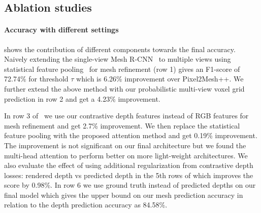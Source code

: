 \subsection{Ablation studies}


\paragraph{Accuracy with different settings}\vspace{-4mm}
 shows the contribution of different components towards the final accuracy. Naively extending the single-view Mesh R-CNN~\cite{gkioxari2019meshrcnn} to multiple views using statistical feature pooling~\cite{wen2019pixel2mesh++} for mesh refinement (row 1) gives an F1-score of 72.74\% for threshold $\tau$ which is 6.26\% improvement over Pixel2Mesh++.
We further extend the above method with our probabilistic multi-view voxel grid prediction in row 2 and get a 4.23\% improvement.

In row 3 of~ we use our contrastive depth features instead of RGB features for mesh refinement and get 2.7\% improvement.
We then replace the statistical feature pooling with the proposed attention method and get 0.19\% improvement.
The improvement is not significant on our final architecture but we found the multi-head attention to perform better on more light-weight architectures.
We also evaluate the effect of using additional regularization from contrastive depth losses: rendered depth vs predicted depth in the 5th rows of which improves the score by 0.98\%.
In row 6 we use ground truth instead of predicted depths on our final model which gives the upper bound on our mesh prediction accuracy in relation to the depth prediction accuracy as 84.58\%.


